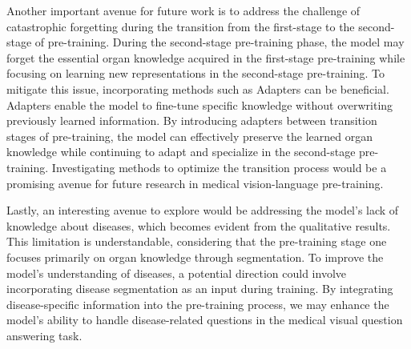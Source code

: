 Another important avenue for future work is to address the challenge of catastrophic forgetting during the transition from the first-stage to the second-stage of pre-training. During the second-stage pre-training phase, the model may forget the essential organ knowledge acquired in the first-stage pre-training while focusing on learning new representations in the second-stage pre-training. To mitigate this issue, incorporating methods such as Adapters \cite{houlsby2019parameter} can be beneficial. Adapters enable the model to fine-tune specific knowledge without overwriting previously learned information. By introducing adapters between transition stages of pre-training, the model can effectively preserve the learned organ knowledge while continuing to adapt and specialize in the second-stage pre-training. Investigating methods to optimize the transition process would be a promising avenue for future research in medical vision-language pre-training.

Lastly, an interesting avenue to explore would be addressing the model's lack of knowledge about diseases, which becomes evident from the qualitative results. This limitation is understandable, considering that the pre-training stage one focuses primarily on organ knowledge through segmentation. To improve the model's understanding of diseases, a potential direction could involve incorporating disease segmentation as an input during training. By integrating disease-specific information into the pre-training process, we may enhance the model's ability to handle disease-related questions in the medical visual question answering task.